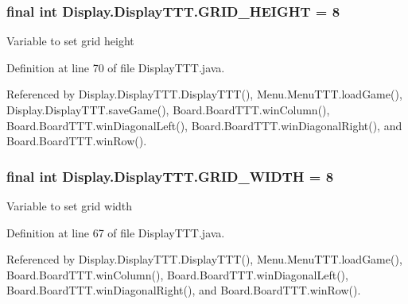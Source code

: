 \subsubsection[{G\+R\+I\+D\+\_\+\+H\+E\+I\+G\+H\+T}]{\setlength{\rightskip}{0pt plus 5cm}final int Display.\+Display\+T\+T\+T.\+G\+R\+I\+D\+\_\+\+H\+E\+I\+G\+H\+T = 8\hspace{0.3cm}{\ttfamily [static]}}\label{class_display_1_1_display_t_t_t_a863d5b47363b01c44552068cd9ee832f}
Variable to set grid height 

Definition at line 70 of file Display\+T\+T\+T.\+java.



Referenced by Display.\+Display\+T\+T\+T.\+Display\+T\+T\+T(), Menu.\+Menu\+T\+T\+T.\+load\+Game(), Display.\+Display\+T\+T\+T.\+save\+Game(), Board.\+Board\+T\+T\+T.\+win\+Column(), Board.\+Board\+T\+T\+T.\+win\+Diagonal\+Left(), Board.\+Board\+T\+T\+T.\+win\+Diagonal\+Right(), and Board.\+Board\+T\+T\+T.\+win\+Row().

\hypertarget{class_display_1_1_display_t_t_t_ac07e05126f3b772dd62b3276defc0b4b}{}
\subsubsection[{G\+R\+I\+D\+\_\+\+W\+I\+D\+T\+H}]{\setlength{\rightskip}{0pt plus 5cm}final int Display.\+Display\+T\+T\+T.\+G\+R\+I\+D\+\_\+\+W\+I\+D\+T\+H = 8\hspace{0.3cm}{\ttfamily [static]}}\label{class_display_1_1_display_t_t_t_ac07e05126f3b772dd62b3276defc0b4b}
Variable to set grid width 

Definition at line 67 of file Display\+T\+T\+T.\+java.



Referenced by Display.\+Display\+T\+T\+T.\+Display\+T\+T\+T(), Menu.\+Menu\+T\+T\+T.\+load\+Game(), Board.\+Board\+T\+T\+T.\+win\+Column(), Board.\+Board\+T\+T\+T.\+win\+Diagonal\+Left(), Board.\+Board\+T\+T\+T.\+win\+Diagonal\+Right(), and Board.\+Board\+T\+T\+T.\+win\+Row().

\hypertarget{class_display_1_1_display_t_t_t_af2ce89b88ce5f8ccae426f4f273d52aa}{}
